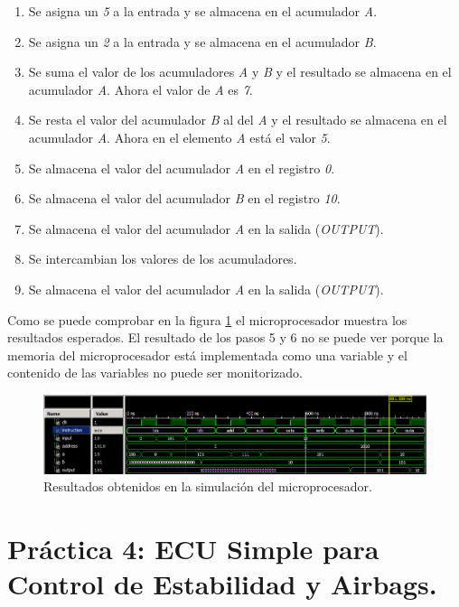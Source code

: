 \documentclass{article}
\begin{document}
\begin{enumerate}
	\item Se asigna un \emph{5} a la entrada y se almacena en el acumulador \emph{A}.
	\item Se asigna un \emph{2} a la entrada y se almacena en el acumulador \emph{B}.
	\item Se suma el valor de los acumuladores \emph{A} y \emph{B} y el resultado se almacena en el acumulador \emph{A}. Ahora el valor de \emph{A} es \emph{7}.
	\item Se resta el valor del acumulador \emph{B} al del \emph{A} y el resultado se almacena en el acumulador \emph{A}. Ahora en el elemento \emph{A} está el valor \emph{5}.
	\item Se almacena el valor del acumulador \emph{A} en el registro \emph{0}.
	\item Se almacena el valor del acumulador \emph{B} en el registro \emph{10}.
	\item Se almacena el valor del acumulador \emph{A} en la salida (\emph{OUTPUT}).
	\item Se intercambian los valores de los acumuladores.
	\item Se almacena el valor del acumulador \emph{A} en la salida (\emph{OUTPUT}).
\end{enumerate}

Como se puede comprobar en la figura \ref{fig:p3:tb} el microprocesador muestra los resultados esperados. El resultado de los pasos 5 y 6 no se puede ver porque la memoria del microprocesador está implementada como una variable y  el contenido de las variables no puede ser monitorizado.

\begin{figure}[h]
  \centering
    \includegraphics[width=1\textwidth]{img/p3_tb.png}
  \caption{Resultados obtenidos en la simulación del microprocesador.}
  \label{fig:p3:tb}
\end{figure}


\section{Práctica 4: ECU Simple para Control de Estabilidad y Airbags.}
\end{document}
